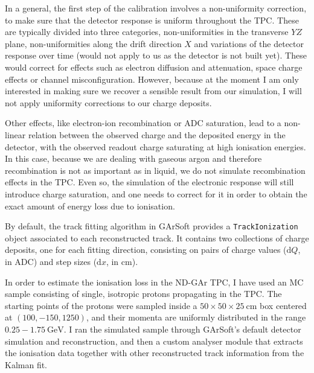 In a general, the first step of the calibration involves a non-uniformity correction, to make sure that the detector response is uniform throughout the TPC. These are typically divided into three categories, non-uniformities in the transverse $YZ$ plane, non-uniformities along the drift direction $X$ and variations of the detector response over time (would not apply to us as the detector is not built yet). These would correct for effects such as electron diffusion and attenuation, space charge effects or channel misconfiguration. However, because at the moment I am only interested in making sure we recover a sensible result from our simulation, I will not apply uniformity corrections to our charge deposits.

Other effects, like electron-ion recombination or ADC saturation, lead to a non-linear relation between the observed charge and the deposited energy in the detector, with the observed readout charge saturating at high ionisation energies. In this case, because we are dealing with gaseous argon and therefore recombination is not as important as in liquid, we do not simulate recombination effects in the TPC. Even so, the simulation of the electronic response will still introduce charge saturation, and one needs to correct for it in order to obtain the exact amount of energy loss due to ionisation.

By default, the track fitting algorithm in GArSoft provides a \texttt{TrackIonization} object associated to each reconstructed track. It contains two collections of charge deposits, one for each fitting direction, consisting on pairs of charge values ($\mathrm{d}Q$, in $\mathrm{ADC}$) and step sizes ($\mathrm{d}x$, in $\mathrm{cm}$).

In order to estimate the ionisation loss in the ND-GAr TPC, I have used an MC sample consisting of single, isotropic protons propagating in the TPC. The starting points of the protons were sampled inside a $50\times50\times25 \ \mathrm{cm}$ box centered at $(100, -150, 1250)$, and their momenta are uniformly distributed in the range $0.25 - 1.75 \ \mathrm{GeV}$. I ran the simulated sample through GArSoft's default detector simulation and reconstruction, and then a custom analyser module that extracts the ionisation data together with other reconstructed track information from the Kalman fit.

